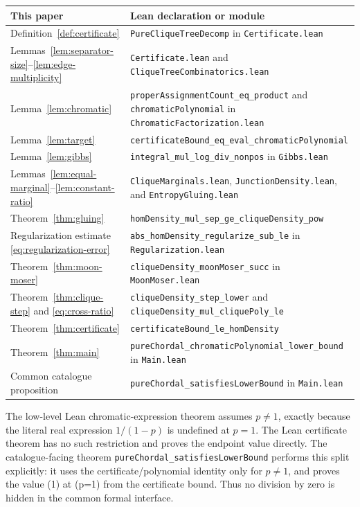 \documentclass[11pt]{article}
\begin{document}
\begin{center}
\begin{tabular}{p{}p{}}
\hline
This paper & Lean declaration or module \\
\hline
Definition~\ref{def:certificate} &
\texttt{PureCliqueTreeDecomp} in \texttt{Certificate.lean} \\
Lemmas~\ref{lem:separator-size}--\ref{lem:edge-multiplicity} &
\texttt{Certificate.lean} and \texttt{CliqueTreeCombinatorics.lean} \\
Lemma~\ref{lem:chromatic} &
\texttt{properAssignmentCount\_eq\_product} and
\texttt{chromaticPolynomial} in \texttt{ChromaticFactorization.lean} \\
Lemma~\ref{lem:target} &
\texttt{certificateBound\_eq\_eval\_chromaticPolynomial} \\
Lemma~\ref{lem:gibbs} &
\texttt{integral\_mul\_log\_div\_nonpos} in \texttt{Gibbs.lean} \\
Lemmas~\ref{lem:equal-marginal}--\ref{lem:constant-ratio} &
\texttt{CliqueMarginals.lean}, \texttt{JunctionDensity.lean}, and
\texttt{EntropyGluing.lean} \\
Theorem~\ref{thm:gluing} &
\texttt{homDensity\_mul\_sep\_ge\_cliqueDensity\_pow} \\
Regularization estimate \eqref{eq:regularization-error} &
\texttt{abs\_homDensity\_regularize\_sub\_le} in
\texttt{Regularization.lean} \\
Theorem~\ref{thm:moon-moser} &
\texttt{cliqueDensity\_moonMoser\_succ} in \texttt{MoonMoser.lean} \\
Theorem~\ref{thm:clique-step} and \eqref{eq:cross-ratio} &
\texttt{cliqueDensity\_step\_lower} and
\texttt{cliqueDensity\_mul\_cliquePoly\_le} \\
Theorem~\ref{thm:certificate} &
\texttt{certificateBound\_le\_homDensity} \\
Theorem~\ref{thm:main} &
\texttt{pureChordal\_chromaticPolynomial\_lower\_bound} in
\texttt{Main.lean} \\
Common catalogue proposition &
\texttt{pureChordal\_satisfiesLowerBound} in \texttt{Main.lean} \\
\hline
\end{tabular}
\end{center}

The low-level Lean chromatic-expression theorem assumes \(p\ne1\), exactly
because the literal real expression \(1/(1-p)\) is undefined at \(p=1\).
The Lean certificate theorem has no such restriction and proves the
endpoint value directly.  The catalogue-facing theorem
\texttt{pureChordal\_satisfiesLowerBound} performs this split explicitly:
it uses the certificate/polynomial identity only for \(p\ne1\), and proves
the value (1) at (p=1) from the certificate bound.  Thus no division by
zero is hidden in the common formal interface.
\end{document}
